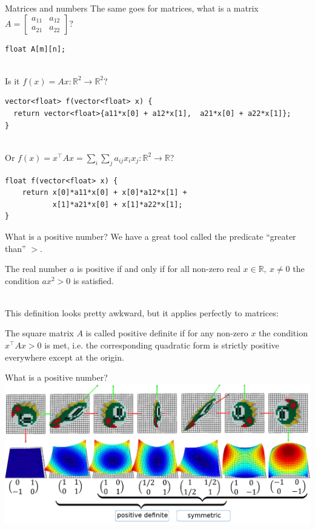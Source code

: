 \documentclass[UKenglish,aspectratio=169]{beamer}
\begin{document}
\begin{frame}[fragile]{Matrices and numbers}
The same goes for matrices, what is a matrix $A=\begin{bmatrix} a_{11} & a_{12} \\ a_{21} & a_{22}\end{bmatrix}$?
\pause
\begin{verbatim}
float A[m][n];
\end{verbatim}

\pause
~\\
Is it $f(x) = Ax : \mathbb R^2 \rightarrow \mathbb R^2$?
\begin{verbatim}
vector<float> f(vector<float> x) {
  return vector<float>{a11*x[0] + a12*x[1],  a21*x[0] + a22*x[1]};
}
\end{verbatim}

\pause
~\\
Or $f(x)= x^\top A x = \sum\limits_i\sum\limits_j a_{ij}x_i x_j  : \mathbb R^2 \rightarrow \mathbb R$?
\begin{verbatim}
float f(vector<float> x) {
    return x[0]*a11*x[0] + x[0]*a12*x[1] +
           x[1]*a21*x[0] + x[1]*a22*x[1];
}
\end{verbatim}
\end{frame}

\begin{frame}{What is a positive number?}
We have a great tool called the predicate ``greater than'' $>$.
\pause
\begin{definition}
The real number $a$ is positive if and only if for all non-zero real $x\in\mathbb R,\ x\neq 0$ the condition $ax^2>0$ is satisfied.
\end{definition}
\pause
~\\
This definition looks pretty awkward, but it applies perfectly to matrices:
\begin{definition}
The square matrix $A$ is called positive definite if for any non-zero $x$
the condition $x^\top A x > 0$ is met, i.e. the corresponding quadratic form is strictly positive everywhere except at the origin.
\end{definition}
\end{frame}

\begin{frame}{What is a positive number?}
\includegraphics[width=\linewidth]{../manuscript/img/matrices}
\end{frame}
\end{document}
